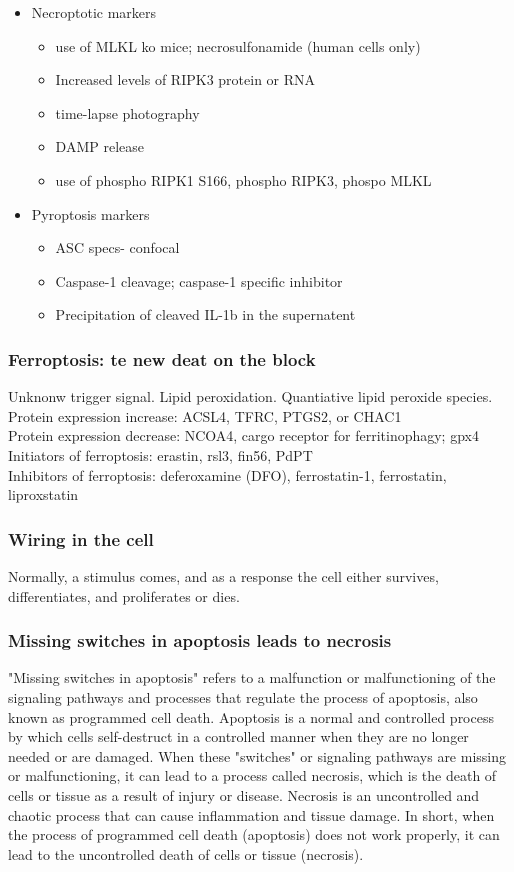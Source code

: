 \begin{itemize}
\begin{itemize}
\begin{itemize}
\item Necroptotic markers
\begin{itemize}
    \item use of MLKL ko mice; necrosulfonamide (human cells only)
    \item Increased levels of RIPK3 protein or RNA
    \item time-lapse photography
    \item DAMP release
    \item use of phospho RIPK1 S166, phospho RIPK3, phospo MLKL
\end{itemize}
\item Pyroptosis markers
\begin{itemize}
    \item ASC specs- confocal
    \item Caspase-1 cleavage; caspase-1 specific inhibitor
    \item Precipitation of cleaved IL-1b in the supernatent
\end{itemize}
\end{itemize}
\subsubsection{Ferroptosis: te new deat on the block}
Unknonw trigger signal. Lipid peroxidation. Quantiative lipid peroxide species.
\\Protein expression increase: ACSL4, TFRC, PTGS2, or CHAC1
\\Protein expression decrease: NCOA4, cargo receptor for ferritinophagy; gpx4
\\Initiators of ferroptosis: erastin, rsl3, fin56, PdPT
\\Inhibitors of ferroptosis: deferoxamine (DFO), ferrostatin-1, ferrostatin, liproxstatin

\subsubsection{Wiring in the cell}
Normally, a stimulus comes, and as a response the cell either survives, differentiates, and proliferates or dies.
\subsubsection{Missing switches in apoptosis leads to necrosis}
"Missing switches in apoptosis" refers to a malfunction or malfunctioning of the signaling pathways and processes that regulate the process of apoptosis, also known as programmed cell death. Apoptosis is a normal and controlled process by which cells self-destruct in a controlled manner when they are no longer needed or are damaged. When these "switches" or signaling pathways are missing or malfunctioning, it can lead to a process called necrosis, which is the death of cells or tissue as a result of injury or disease. Necrosis is an uncontrolled and chaotic process that can cause inflammation and tissue damage. In short, when the process of programmed cell death (apoptosis) does not work properly, it can lead to the uncontrolled death of cells or tissue (necrosis).

\end{itemize}
\end{itemize}
